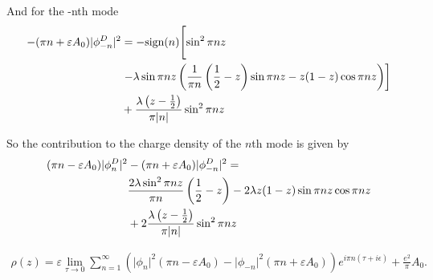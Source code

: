 And for the -nth mode
\begin{align*}
-(\pi n + \varepsilon A_0)	\lvert \phi_{-n}^{D}\rvert^2
&= -\text{sign}(n)\Biggl[ \sin^2\pi n z  \\
									  & \left.- \lambda \sin \pi n z		\left( 
			\frac{1}{\pi n}\left( \frac{1}{2} - z \right) \sin \pi n z - z(1-z) \cos \pi n z \right) 
		\right] \\
									  &+ \frac{\lambda \left( z-\frac{1}{2} \right)}{\pi \abs{n}}
\sin^2\pi n z  
\end{align*}

So the contribution to the charge density of the $n$th mode is given by 
\begin{align*}
	(\pi n - \varepsilon A_0)	\lvert \phi_{n}^{D}\rvert^2 
	&-(\pi n + \varepsilon A_0)	\lvert \phi_{-n}^{D}\rvert^2 = \\
	& \frac{2 \lambda \sin^2 \pi n z }{\pi n}\left( \frac{1}{2}-z \right)  - 2\lambda z (1-z )\sin \pi n z  \cos \pi n z  \\&+ 2 \frac{\lambda \left( z-\frac{1}{2} \right) }{\pi \abs{n}}\sin ^2 \pi n z
\end{align*}

\begin{align}
\rho(z) = \varepsilon \lim_{\tau\to 0} \sum_{n=1}^{\infty} \left( \lvert \phi_n\rvert ^2 (\pi n - \varepsilon A_0) - \lvert \phi_{-n}\rvert ^2 (\pi n + \varepsilon A_0) \right)  e^{i \pi n (\tau + i \epsilon)} + \frac{e^2}{\pi}A_0.
\end{align}

